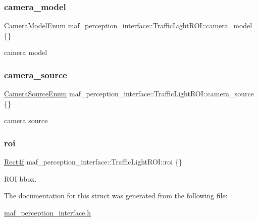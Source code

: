 \subsubsection{\texorpdfstring{camera\+\_\+model}{camera\_model}}
{\footnotesize\ttfamily \hyperlink{structmaf__perception__interface_1_1CameraModelEnum}{Camera\+Model\+Enum} maf\+\_\+perception\+\_\+interface\+::\+Traffic\+Light\+R\+O\+I\+::camera\+\_\+model \{\}}



camera model 

\mbox{\label{structmaf__perception__interface_1_1TrafficLightROI_a8114f75f8c3feab954f04c4064cd3bbc}} 
\subsubsection{\texorpdfstring{camera\+\_\+source}{camera\_source}}
{\footnotesize\ttfamily \hyperlink{structmaf__perception__interface_1_1CameraSourceEnum}{Camera\+Source\+Enum} maf\+\_\+perception\+\_\+interface\+::\+Traffic\+Light\+R\+O\+I\+::camera\+\_\+source \{\}}



camera source 

\mbox{\label{structmaf__perception__interface_1_1TrafficLightROI_a6f9356dea3ea5ff64d1da44609b6391e}} 
\subsubsection{\texorpdfstring{roi}{roi}}
{\footnotesize\ttfamily \hyperlink{structmaf__perception__interface_1_1Rect4f}{Rect4f} maf\+\_\+perception\+\_\+interface\+::\+Traffic\+Light\+R\+O\+I\+::roi \{\}}



R\+OI bbox. 



The documentation for this struct was generated from the following file\+:\begin{DoxyCompactItemize}
\item 
\hyperlink{maf__perception__interface_8h}{maf\+\_\+perception\+\_\+interface.\+h}\end{DoxyCompactItemize}
